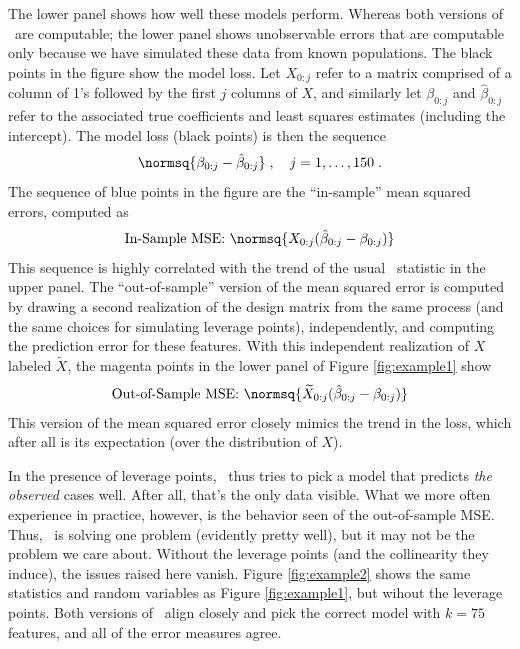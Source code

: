 \documentclass[12pt]{article}
\begin{document}
 The lower panel shows how well these models perform. Whereas both versions of
 \aic\ are computable; the lower panel shows unobservable errors that are
 computable only because we have simulated these data from known
 populations. The black points in the figure show the model loss.  Let $X_{0:j}$
 refer to a matrix comprised of a column of 1's followed by the first $j$
 columns of $X$, and similarly let $\beta_{0:j}$ and $\hat\beta_{0:j}$ refer to
 the associated true coefficients and least squares estimates (including the
 intercept).  The model loss (black points) is then the sequence 
 \begin{displaymath}
    \normsq{ \beta_{0:j} - \hat\beta_{0:j}} \;, \quad j = 1,\ldots,150 \;.
 \end{displaymath}
 The sequence of blue points in the figure are the ``in-sample'' mean squared
errors, computed as 
 \begin{displaymath}
    \mbox{In-Sample MSE:  } \normsq{ X_{0:j}(\hat\beta_{0:j}-\beta_{0:j}) }   
 \end{displaymath} 
 This sequence is highly correlated with the trend of the usual \aic\ statistic
 in the upper panel.  The ``out-of-sample'' version of the mean squared error is
 computed by drawing a second realization of the design matrix from the same
 process (and the same choices for simulating leverage points), independently,
 and computing the prediction error for these features.  With this independent
realization of $X$ labeled $\widetilde{X}$, the magenta points in the lower
panel of Figure \ref{fig:example1} show
 \begin{displaymath}
    \mbox{Out-of-Sample MSE:  } \normsq{ \widetilde{X}_{0:j}(\hat\beta_{0:j}-\beta_{0:j}) }   
 \end{displaymath} 
 This version of the mean squared error closely mimics the trend in the loss,
 which after all is its expectation (over the distribution of $X$).


 In the presence of leverage points, \aic\ thus tries to pick a model that
 predicts {\em the observed} cases well.  After all, that's the only data
 visible.  What we more often experience in practice, however, is the behavior
 seen of the out-of-sample MSE.  Thus, \aic\ is solving one problem (evidently
 pretty well), but it may not be the problem we care about.  Without the
 leverage points (and the collinearity they induce), the issues raised here
 vanish.  Figure \ref{fig:example2} shows the same statistics and random
 variables as Figure \ref{fig:example1}, but wihout the leverage points. Both
 versions of \aic\ align closely and pick the correct model with $k=75$
 features, and all of the error measures agree.
\end{document}
